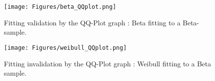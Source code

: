              \begin{figure}[H]
               \begin{center}
                 \texttt{[image: Figures/beta\_QQplot.png]}
               \end{center}
               \caption{Fitting validation by the QQ-Plot graph : Beta fitting to a Beta-sample.}
               \label{qqplotExRight}
             \end{figure}

             \begin{figure}[H]
               \begin{center}
                 \texttt{[image: Figures/weibull\_QQplot.png]}
               \end{center}
               \caption{Fitting invalidation by the QQ-Plot graph : Weibull fitting to a Beta sample.}
               \label{qqplotExFalse}
             \end{figure}
